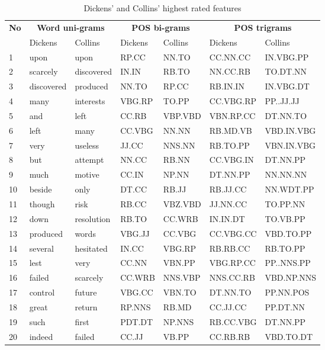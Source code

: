 \documentclass[a4paper,10pt,twoside,fleqn]{article}
\begin{document}
\begin{table}[h!]
\small

\caption{Dickens' and Collins' highest rated features }
\label{tab:results-features-dc}
\begin{tabular}{lllllll}\toprule[1.2pt]
 \multicolumn{1}{c}{\textbf{No}} & \multicolumn{2}{c}{\textbf{Word uni-grams}}&  
 \multicolumn{2}{c}{\textbf{POS bi-grams}} & \multicolumn{2}{c}{\textbf{POS trigrams}}\\
 \cmidrule(r){1-1} 
 \cmidrule(r){2-3} 
\cmidrule(r){4-5} 
 \cmidrule(r){6-7}
    & Dickens	  &  Collins    & Dickens&  Collins& Dickens	  &  Collins   \\\midrule
1   &       upon  &       upon  &  RP.CC  &   NN.TO  &  CC.NN.CC   & IN.VBG.PP \\
2   &   scarcely  & discovered  &  IN.IN  &   RB.TO  &  NN.CC.RB   &   TO.DT.NN  \\
3   & discovered  &   produced  &  NN.TO  &   RP.CC  &  RB.IN.IN   &  IN.VBG.DT \\
4   &       many  &  interests  & VBG.RP  &  TO.PP  & CC.VBG.RP   &  PP..JJ.JJ \\
5   &        and  &       left  &  CC.RB  & VBP.VBD  & VBN.RP.CC   &   DT.NN.TO \\
6   &       left  &       many  & CC.VBG  &   NN.NN  &  RB.MD.VB   & VBD.IN.VBG \\
7   &       very  &    useless  &  JJ.CC  &  NNS.NN  & RB.TO.PP   & VBN.IN.VBG \\
8   &        but  &    attempt  &  NN.CC  &   RB.NN  & CC.VBG.IN   &  DT.NN.PP \\
9   &       much  &     motive  &  CC.IN  &   NP.NN  & DT.NN.PP   &   NN.NN.NN \\
10  &     beside  &       only  &  DT.CC  &   RB.JJ  &  RB.JJ.CC   & NN.WDT.PP \\
11  &     though  &       risk  &  RB.CC  & VBZ.VBD  &  JJ.NN.CC   &  TO.PP.NN \\
12  &       down  & resolution  &  RB.TO  &  CC.WRB  &  IN.IN.DT   &  TO.VB.PP \\
13  &   produced  &      words  & VBG.JJ  &  CC.VBG  & CC.VBG.CC   & VBD.TO.PP \\
14  &    several  &  hesitated  &  IN.CC  &  VBG.RP  &  RB.RB.CC   &  RB.TO.PP \\
15  &       lest  &       very  &  CC.NN  & VBN.PP  & VBG.RP.CC   & PP..NNS.PP \\
16  &     failed  &   scarcely  & CC.WRB  & NNS.VBP  & NNS.CC.RB   & VBD.NP.NNS \\
17  &    control  &     future  & VBG.CC  &  VBN.TO  &  DT.NN.TO   & PP.NN.POS \\
18  &      great  &     return  & RP.NNS  &   RB.MD  &  CC.JJ.CC   &   PP.DT.NN \\
19  &       such  &      first  & PDT.DT  &  NP.NNS  & RB.CC.VBG   &   DT.NN.PP \\
20  &     indeed  &     failed  &  CC.JJ  &  VB.PP  &  CC.RB.RB   &  VBD.TO.DT \\
\bottomrule
\end{tabular}
\end{table}
\end{document}
